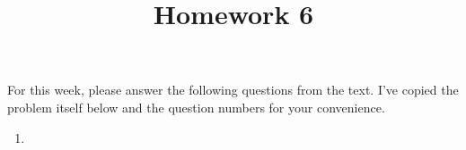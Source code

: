 \documentclass[12pt]{amsart}
\theoremstyle{definition}
\begin{document}
\title{Homework 6}

\maketitle

For this week, please answer the following questions from the text. 
I've copied the problem itself below and the question numbers for 
your convenience. 

\begin{enumerate}
	\item 
\end{enumerate}
\end{document}
